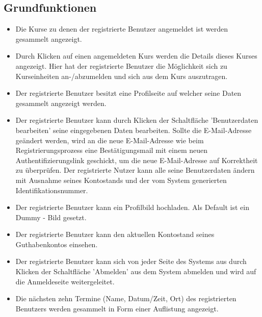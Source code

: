 \documentclass[a4paper]{scrreprt}
\begin{document}
\subsection{Grundfunktionen}
\begin{itemize}
	\item {}
	Die Kurse zu denen der registrierte Benutzer angemeldet ist werden gesammelt angezeigt.
	\item {}
	Durch Klicken auf einen angemeldeten Kurs werden die Details dieses Kurses angezeigt. Hier hat der registrierte Benutzer die Möglichkeit sich zu Kurseinheiten an-/abzumelden und sich aus dem Kurs auszutragen.
	\item {}
	Der registrierte Benutzer besitzt eine Profilseite auf welcher seine Daten gesammelt angezeigt werden. 
	\item {}
	Der registrierte Benutzer kann durch Klicken der Schaltfläche 'Benutzerdaten bearbeiten' seine eingegebenen Daten bearbeiten. Sollte die E-Mail-Adresse geändert werden, wird an die neue E-Mail-Adresse wie beim Registrierungsprozess eine Bestätigungsmail mit einem neuen Authentifizierungslink geschickt, um die neue E-Mail-Adresse auf Korrektheit zu überprüfen.
	Der registrierte Nutzer kann alle seine Benutzerdaten ändern mit Ausnahme seines Kontostands und der vom System generierten Identifikationsnummer.
	\item {}
	Der registrierte Benutzer kann ein Profilbild hochladen. Als Default ist ein Dummy - Bild gesetzt.
	\item {}
	Der registrierte Benutzer kann den aktuellen Kontostand seines Guthabenkontos einsehen. 
	\item {}
	Der registrierte Benutzer kann sich  von jeder Seite des Systems aus durch Klicken der Schaltfläche 'Abmelden' aus dem System abmelden und wird auf die Anmeldeseite weitergeleitet.
	\item {}
	Die nächsten zehn Termine (Name, Datum/Zeit, Ort) des registrierten Benutzers werden gesammelt in Form einer Auflistung angezeigt.
\end{itemize}		
\end{document}
